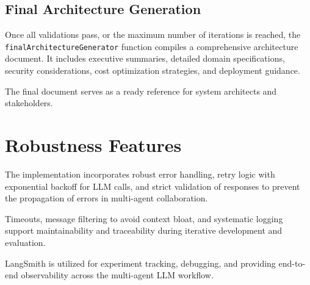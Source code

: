 \subsection{Final Architecture Generation}

Once all validations pass, or the maximum number of iterations is reached, the \texttt{finalArchitectureGenerator} function compiles a comprehensive architecture document. It includes executive summaries, detailed domain specifications, security considerations, cost optimization strategies, and deployment guidance.

The final document serves as a ready reference for system architects and stakeholders.

\section{Robustness Features}

The implementation incorporates robust error handling, retry logic with exponential backoff for LLM calls, and strict validation of responses to prevent the propagation of errors in multi-agent collaboration.

Timeouts, message filtering to avoid context bloat, and systematic logging support maintainability and traceability during iterative development and evaluation.

LangSmith is utilized for experiment tracking, debugging, and providing end-to-end observability across the multi-agent LLM workflow.